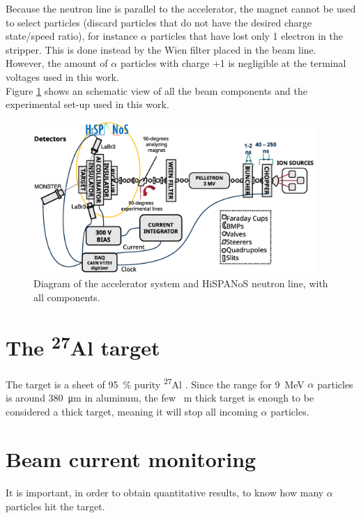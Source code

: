\documentclass[a4paper,12pt]{report}
\newcommand{\Aliso}{\textsuperscript{27}Al }
\begin{document}
Because the neutron line is parallel to the accelerator, the magnet cannot be used to select particles (discard particles that do not have the desired charge state/speed ratio), for instance $\alpha$ particles that have lost only 1 electron in the stripper.
This is done instead by the Wien filter placed in the beam line.
However, the amount of $\alpha$ particles with charge +1 is negligible at the terminal voltages used in this work.
\\

Figure \ref{tandemdiagrama} shows an schematic view of all the beam components and the experimental set-up used in this work.

\begin{figure}[H]
	\centering
	\includegraphics[width=0.95\textwidth]{tandemdiagrama.eps}
	\caption{Diagram of the accelerator system and HiSPANoS neutron line, with all components.}
	\label{tandemdiagrama}
\end{figure}

\section{The \Aliso target}
The target is a sheet of \qty{95}{\percent} purity \Aliso.
Since the range for 9~MeV $\alpha$ particles is around \qty{380}{\micro\m} in aluminum, the few \unit{\mili\m} thick target is enough to be considered a thick target, meaning it will stop all incoming $\alpha$ particles.
\\

\section{Beam current monitoring}
It is important, in order to obtain quantitative results, to know how many $\alpha$ particles hit the target.
\end{document}
